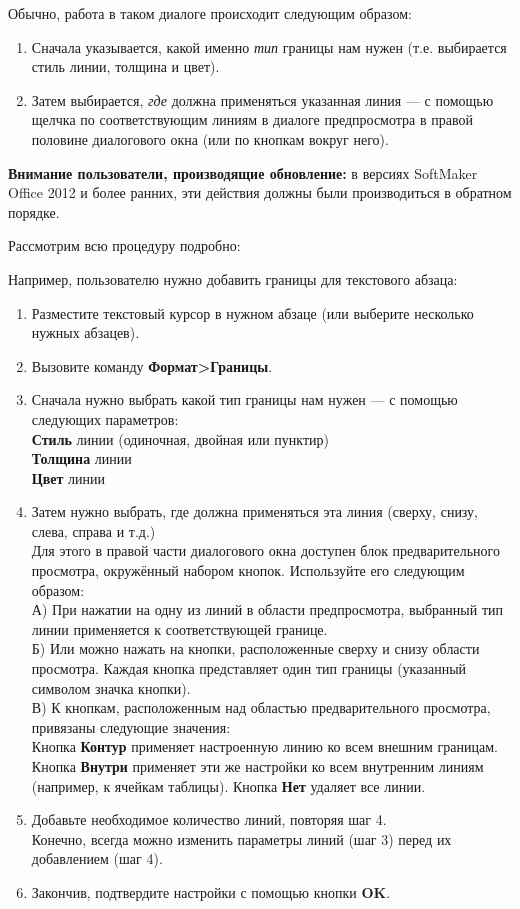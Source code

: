 \documentclass[a4paper,10pt]{article}
\begin{document}
Обычно, работа в таком диалоге происходит следующим образом:
\begin{enumerate}
 \item Сначала указывается, какой именно \textit{тип} границы нам нужен (т.е. выбирается стиль линии, толщина и цвет).
 \item Затем  выбирается, \textit{где} должна применяться указанная линия — с помощью щелчка по соответствующим линиям в диалоге предпросмотра в правой половине диалогового окна (или по кнопкам вокруг него).
\end{enumerate}

\begin{mdframed}[backgroundcolor=blue!10]
\textbf{Внимание пользователи, производящие обновление:} в версиях SoftMaker Office 2012 и более ранних, эти действия должны были производиться в обратном порядке.
\end{mdframed}

Рассмотрим всю процедуру подробно:

Например, пользователю нужно добавить границы для текстового абзаца:
\begin{enumerate}
 \item Разместите текстовый курсор в нужном абзаце (или выберите несколько нужных абзацев).
 \item Вызовите команду \textbf{Формат>Границы}. 
 \item Сначала нужно выбрать какой тип границы нам нужен --- с помощью следующих параметров:\\
\textbf{Стиль} линии (одиночная, двойная или пунктир)\\
\textbf{Толщина} линии\\
\textbf{Цвет} линии
\item Затем нужно выбрать, где должна применяться эта линия (сверху, снизу, слева, справа и т.д.)\\
Для этого в правой части диалогового окна доступен блок предварительного просмотра, окружённый набором кнопок. Используйте его следующим образом:\\
А) При нажатии на одну из линий в области предпросмотра, выбранный тип линии применяется к соответствующей границе.\\
Б) Или можно нажать на кнопки, расположенные сверху и снизу области просмотра. Каждая кнопка представляет один тип границы (указанный символом значка кнопки).\\
В) К кнопкам, расположенным над областью предварительного просмотра, привязаны следующие значения:\\
Кнопка \textbf{Контур} применяет настроенную линию ко всем внешним границам.
Кнопка \textbf{Внутри} применяет эти же настройки ко всем внутренним линиям (например, к ячейкам таблицы).
Кнопка \textbf{Нет} удаляет все линии.
\item Добавьте необходимое количество линий, повторяя шаг 4.\\ 
Конечно, всегда можно изменить параметры линий (шаг 3) перед их добавлением (шаг 4).
\item Закончив, подтвердите настройки с помощью кнопки \textbf{OK}.
\end{enumerate}
\end{document}
